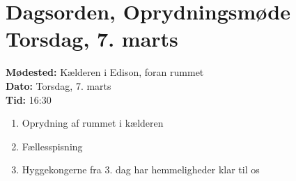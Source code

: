 

\newcommand{\meeting}{Oprydningsmøde}
\newcommand{\date}{Torsdag, 7. marts}
\newcommand{\time}{16:30}
\newcommand{\location}{Kælderen i Edison, foran rummet}



\section*{Dagsorden, \meeting{} \date{}}
\textbf{Mødested:} \location{}\\
\textbf{Dato:} \date{}\\
\textbf{Tid:} \time{}

\begin{enumerate}
  \item Oprydning af rummet i kælderen
  \item Fællesspisning
  \item Hyggekongerne fra 3. dag har hemmeligheder klar til os
\end{enumerate}




